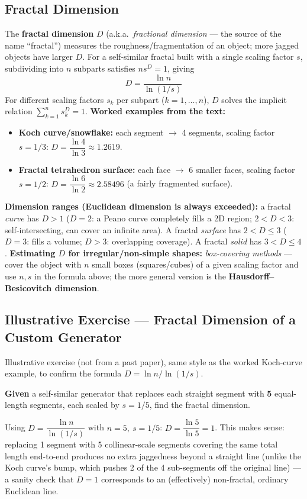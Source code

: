 \documentclass[12pt, a4paper]{article}
\newenvironment{solutionbox}{\begin{mdframed}[style=solutionframe]}{\end{mdframed}}
\newenvironment{answerbox}{\begin{mdframed}[style=answerframe]}{\end{mdframed}}
\newenvironment{notesbox}{\begin{mdframed}[style=notesframe]}{\end{mdframed}}
\begin{document}
\subsection{Fractal Dimension}
\begin{answerbox}
The \textbf{fractal dimension} $D$ (a.k.a.\ \emph{fractional dimension} — the source of the name ``fractal'') measures the roughness/fragmentation of an object; more jagged objects have larger $D$. For a self-similar fractal built with a single scaling factor $s$, subdividing into $n$ subparts satisfies $ns^D=1$, giving
$$D = \frac{\ln n}{\ln(1/s)}$$
For different scaling factors $s_k$ per subpart ($k=1,\dots,n$), $D$ solves the implicit relation $\sum_{k=1}^n s_k^D = 1$.
\textbf{Worked examples from the text:}
\begin{itemize}[noitemsep]
  \item \textbf{Koch curve/snowflake:} each segment $\to$ 4 segments, scaling factor $s=1/3$: $D=\dfrac{\ln4}{\ln3}\approx1.2619$.
  \item \textbf{Fractal tetrahedron surface:} each face $\to$ 6 smaller faces, scaling factor $s=1/2$: $D=\dfrac{\ln6}{\ln2}\approx2.58496$ (a fairly fragmented surface).
\end{itemize}
\textbf{Dimension ranges (Euclidean dimension is always exceeded):} a fractal \emph{curve} has $D>1$ ($D=2$: a Peano curve completely fills a 2D region; $2<D<3$: self-intersecting, can cover an infinite area). A fractal \emph{surface} has $2<D\le3$ ($D=3$: fills a volume; $D>3$: overlapping coverage). A fractal \emph{solid} has $3<D\le4$.
\textbf{Estimating $D$ for irregular/non-simple shapes:} \emph{box-covering methods} — cover the object with $n$ small boxes (squares/cubes) of a given scaling factor and use $n,s$ in the formula above; the more general version is the \textbf{Hausdorff--Besicovitch dimension}.
\end{answerbox}

\subsection*{Illustrative Exercise --- Fractal Dimension of a Custom Generator}
\begin{notesbox}
Illustrative exercise (not from a past paper), same style as the worked Koch-curve example, to confirm the formula $D=\ln n/\ln(1/s)$.
\end{notesbox}
\begin{solutionbox}
\textbf{Given} a self-similar generator that replaces each straight segment with \textbf{5} equal-length segments, each scaled by $s=1/5$, find the fractal dimension.
\end{solutionbox}
\begin{answerbox}
Using $D=\dfrac{\ln n}{\ln(1/s)}$ with $n=5,\ s=1/5$: $D=\dfrac{\ln5}{\ln5}=1$. This makes sense: replacing 1 segment with 5 collinear-scale segments covering the same total length end-to-end produces no extra jaggedness beyond a straight line (unlike the Koch curve's bump, which pushes 2 of the 4 sub-segments off the original line) — a sanity check that $D=1$ corresponds to an (effectively) non-fractal, ordinary Euclidean line.
\end{answerbox}
\end{document}
